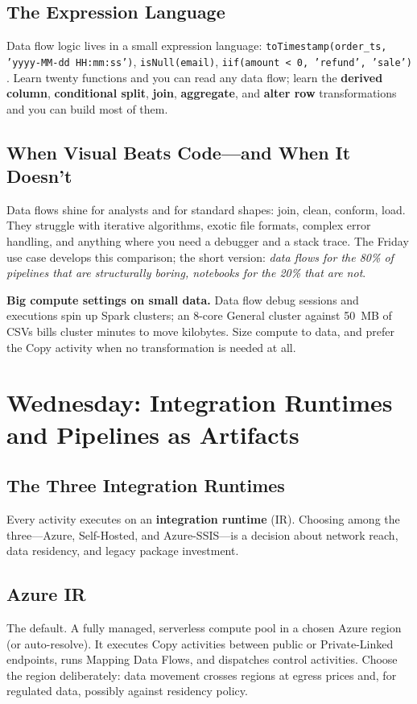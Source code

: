 \subsection{The Expression Language}
Data flow logic lives in a small expression language: \texttt{toTimestamp(order\_ts, 'yyyy-MM-dd HH:mm:ss')}, \texttt{isNull(email)}, \texttt{iif(amount < 0, 'refund', 'sale')} \cite{microsoft2025adfDataFlowFunctions}. Learn twenty functions and you can read any data flow; learn the \textbf{derived column}, \textbf{conditional split}, \textbf{join}, \textbf{aggregate}, and \textbf{alter row} transformations and you can build most of them.

\subsection{When Visual Beats Code---and When It Doesn't}
Data flows shine for analysts and for standard shapes: join, clean, conform, load. They struggle with iterative algorithms, exotic file formats, complex error handling, and anything where you need a debugger and a stack trace. The Friday use case develops this comparison; the short version: \emph{data flows for the 80\% of pipelines that are structurally boring, notebooks for the 20\% that are not}.

\begin{pitfall}
\textbf{Big compute settings on small data.} Data flow debug sessions and executions spin up Spark clusters; an 8-core General cluster against 50~MB of CSVs bills cluster minutes to move kilobytes. Size compute to data, and prefer the Copy activity when no transformation is needed at all.
\end{pitfall}

\section{Wednesday: Integration Runtimes and Pipelines as Artifacts}

\subsection{The Three Integration Runtimes}
Every activity executes on an \textbf{integration runtime} (IR). Choosing among the three---Azure, Self-Hosted, and Azure-SSIS---is a decision about network reach, data residency, and legacy package investment.

\subsection{Azure IR}
The default. A fully managed, serverless compute pool in a chosen Azure region (or auto-resolve). It executes Copy activities between public or Private-Linked endpoints, runs Mapping Data Flows, and dispatches control activities. Choose the region deliberately: data movement crosses regions at egress prices and, for regulated data, possibly against residency policy.


